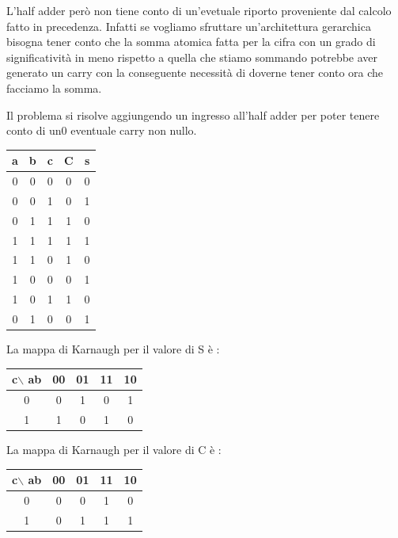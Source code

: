 \documentclass[a4paper]{book}
\begin{document}
L'half adder però non tiene conto di un'evetuale riporto proveniente dal calcolo fatto in precedenza.
Infatti se vogliamo sfruttare un'architettura gerarchica bisogna tener conto che la somma atomica fatta per la cifra con un grado di significatività in meno rispetto a quella che stiamo sommando potrebbe aver generato un carry con la conseguente necessità di doverne tener conto ora che facciamo la somma.


Il problema si risolve aggiungendo un ingresso all'half adder per poter tenere conto di un0 eventuale carry non nullo.

\begin{tabular}{|c|c|c|c|c|}
\hline
a & b & c & C & s \\
\hline
0 & 0 & 0 & 0 & 0 \\
\hline
0 & 0 & 1 & 0 & 1 \\
\hline
0 & 1 & 1 & 1 & 0 \\
\hline
1 & 1 & 1 & 1 & 1 \\
\hline
1 & 1 & 0 & 1 & 0 \\
\hline
1 & 0 & 0 & 0 & 1 \\
\hline
1 & 0 & 1 & 1 & 0 \\
\hline
0 & 1 & 0 & 0 & 1 \\
\hline 

\end{tabular}



La mappa di Karnaugh per il valore di S è :

\begin{tabular}{|c|c|c|c|c|}
\hline
c$\backslash$ ab & 00 & 01 & 11 & 10 \\
\hline
0              & 0  & \cellcolor{yellow}1  &  0 & \cellcolor{yellow}1  \\
\hline
1              & \cellcolor{yellow}1  & 0  & \cellcolor{yellow}1  & 0  \\
\hline
\end{tabular}

La mappa di Karnaugh per il valore di C è :

\begin{tabular}{|c|c|c|c|c|}
\hline
c$\backslash$ ab & 00 & 01 & 11 & 10 \\
\hline
0              & 0  & 0  &  \cellcolor{yellow}1 & 0  \\
\hline
1              & 0  & \cellcolor{yellow}1  & \cellcolor{yellow}1  & \cellcolor{yellow}1  \\
\hline
\end{tabular}
\end{document}
